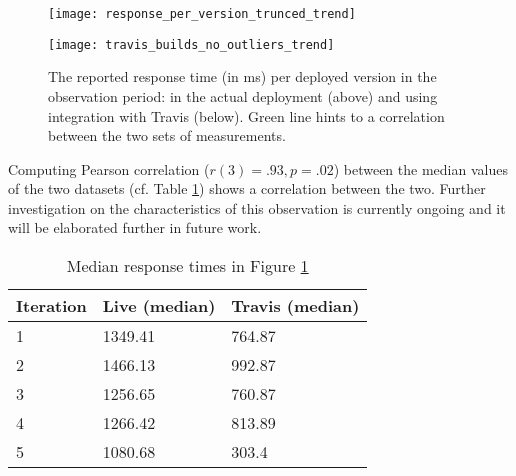       \begin{figure}[h!]
        \centering
        \texttt{[image: response\_per\_version\_trunced\_trend]}


        \advance\leftskip-0.2cm
        \texttt{[image: travis\_builds\_no\_outliers\_trend]}
        \caption{The reported response time (in ms) per deployed version in the observation period: 
        in the actual deployment (above) and using integration with Travis (below). 
        Green line hints to a correlation between the two sets of measurements. }        
        
        \label{fig:response_times_preemptive}
      \end{figure}

  Computing Pearson correlation ($r(3)=.93, p=.02$) between the median values of the two datasets (cf. Table \ref{tab:correlations}) shows a correlation between the two. Further investigation on the characteristics of this observation is currently ongoing and it will be elaborated further in future work.


    \begin{table}[h]
      
      \centering
      \begin{tabular}{lll}
        \toprule
        Iteration & \bfseries Live (median) & \bfseries Travis (median)\\
        \midrule
        1 & 1349.41 & 764.87\\ 
        2 & 1466.13 & 992.87\\
        3 & 1256.65 & 760.87\\
        4 & 1266.42 & 813.89\\
        5 & 1080.68 & 303.4\\
      \bottomrule
      
      \end{tabular}
      \caption{Median response times in Figure \ref{fig:response_times_preemptive}}
      \label{tab:correlations}
    \end{table}




  

